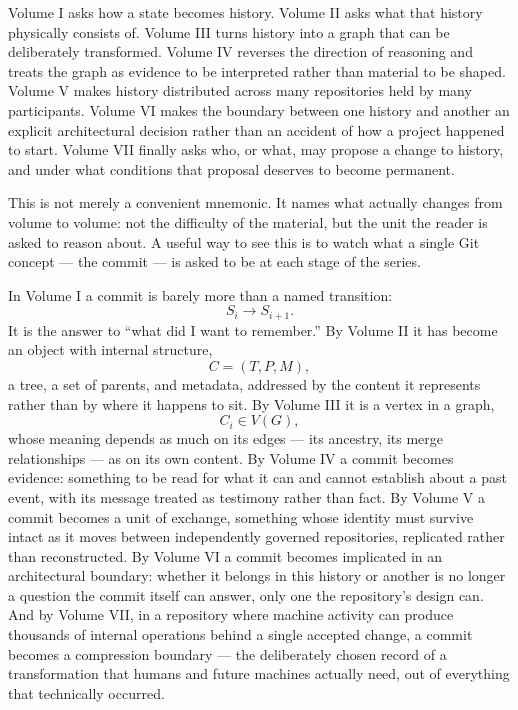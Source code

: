 \documentclass[11pt]{book}
\newcommand{\subheading}[1]{\bigskip\noindent{\bfseries\itshape #1}\smallskip\par}
\begin{document}
Volume I asks how a state becomes history. Volume II asks what that history physically consists of. Volume III turns history into a graph that can be deliberately transformed. Volume IV reverses the direction of reasoning and treats the graph as evidence to be interpreted rather than material to be shaped. Volume V makes history distributed across many repositories held by many participants. Volume VI makes the boundary between one history and another an explicit architectural decision rather than an accident of how a project happened to start. Volume VII finally asks who, or what, may propose a change to history, and under what conditions that proposal deserves to become permanent.

This is not merely a convenient mnemonic. It names what actually changes from volume to volume: not the difficulty of the material, but the unit the reader is asked to reason about. A useful way to see this is to watch what a single Git concept --- the commit --- is asked to be at each stage of the series.

\subheading{The Commit's Seven Meanings}

In Volume I a commit is barely more than a named transition:
\[
S_i \longrightarrow S_{i+1}.
\]
It is the answer to ``what did I want to remember.'' By Volume II it has become an object with internal structure,
\[
C = (T, P, M),
\]
a tree, a set of parents, and metadata, addressed by the content it represents rather than by where it happens to sit. By Volume III it is a vertex in a graph,
\[
C_i \in V(G),
\]
whose meaning depends as much on its edges --- its ancestry, its merge relationships --- as on its own content. By Volume IV a commit becomes evidence: something to be read for what it can and cannot establish about a past event, with its message treated as testimony rather than fact. By Volume V a commit becomes a unit of exchange, something whose identity must survive intact as it moves between independently governed repositories, replicated rather than reconstructed. By Volume VI a commit becomes implicated in an architectural boundary: whether it belongs in this history or another is no longer a question the commit itself can answer, only one the repository's design can. And by Volume VII, in a repository where machine activity can produce thousands of internal operations behind a single accepted change, a commit becomes a compression boundary --- the deliberately chosen record of a transformation that humans and future machines actually need, out of everything that technically occurred.
\end{document}
